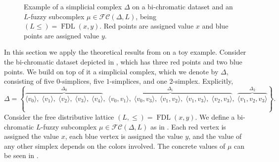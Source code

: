 \documentclass[a4paper,10pt]{article}
\newcommand{\calfc}{\mathcal{FC}}
\DeclareMathOperator{\fdl}{FDL}
\begin{document}
\begin{figure}
\begin{subfigure}[b]{0.45\textwidth}
\label{fig:mu}
\end{subfigure}
\caption{Example of a simplicial complex \(\Delta\) on a bi-chromatic dataset and an \(L\)-fuzzy subcomplex \(\mu \in \calfc(\Delta,L)\), being \((L\leq)=\fdl(x,y)\). Red points are assigned value \(x\) and blue points are assigned value \(y\).}
\label{fig:delta_mu}
\end{figure}

In this section we apply the theoretical results from  on a toy example. Consider the bi-chromatic dataset depicted in , which has three red points and two blue points. We build on top of it a simplicial complex, which we denote by \(\Delta\), consisting of five \(0\)-simplices, five \(1\)-simplices, and one \(2\)-simplex. Explicitly,
\[
\Delta = 
\left\{
\overbrace{\langle v_0\rangle,\; \langle v_1\rangle,\; \langle v_2\rangle,\; \langle v_3\rangle,\; \langle v_4\rangle}^{\Delta_0},\;
\overbrace{\langle v_0,v_1\rangle,\; \langle v_0,v_3\rangle,\; \langle v_1,v_2\rangle,\;\langle v_1,v_3\rangle,\; \langle v_2,v_3\rangle}^{\Delta_1},\;
\overbrace{\langle v_1,v_2,v_3\rangle}^{\Delta_2}
\right\}.
\]
Consider the free distributive lattice \((L,\leq)=\fdl(x,y)\). 
We define a bi-chromatic \(L\)-fuzzy subcomplex \(\mu \in \calfc(\Delta,L)\) as in . Each red vertex is assigned the value \(x\), each blue vertex is assigned the value \(y\), and the value of any other simplex depends on the colors involved. The concrete values of \(\mu\) can be seen in .
\end{document}
